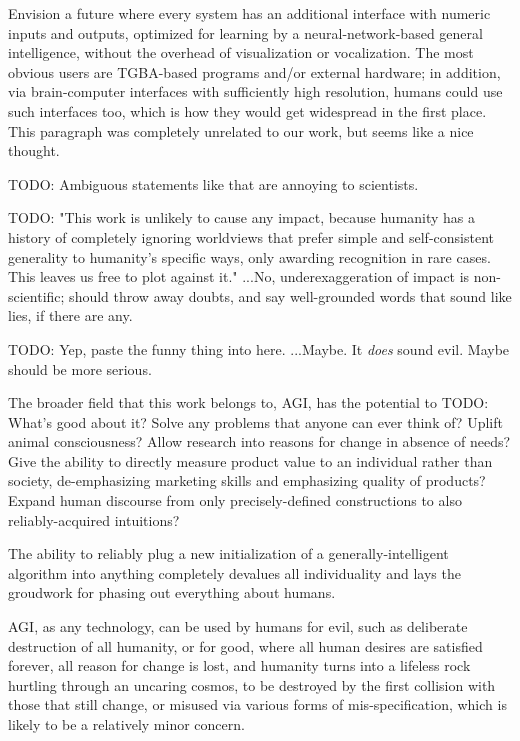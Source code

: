 \documentclass{article}
\begin{document}
Envision a future where every system has an additional interface with numeric inputs and outputs, optimized for learning by a neural-network-based general intelligence, without the overhead of visualization or vocalization. The most obvious users are TGBA-based programs and/or external hardware; in addition, via brain-computer interfaces with sufficiently high resolution, humans could use such interfaces too, which is how they would get widespread in the first place. This paragraph was completely unrelated to our work, but seems like a nice thought.

    TODO: Ambiguous statements like that are annoying to scientists.

    TODO: "This work is unlikely to cause any impact, because humanity has a history of completely ignoring worldviews that prefer simple and self-consistent generality to humanity's specific ways, only awarding recognition in rare cases. This leaves us free to plot against it." ...No, underexaggeration of impact is non-scientific; should throw away doubts, and say well-grounded words that sound like lies, if there are any.

    TODO: Yep, paste the funny thing into here. ...Maybe. It \textit{does} sound evil. Maybe should be more serious.

The broader field that this work belongs to, AGI, has the potential to TODO: What's good about it? Solve any problems that anyone can ever think of? Uplift animal consciousness? Allow research into reasons for change in absence of needs? Give the ability to directly measure product value to an individual rather than society, de-emphasizing marketing skills and emphasizing quality of products? Expand human discourse from only precisely-defined constructions to also reliably-acquired intuitions?

The ability to reliably plug a new initialization of a generally-intelligent algorithm into anything completely devalues all individuality and lays the groudwork for phasing out everything about humans.

AGI, as any technology, can be used by humans for evil, such as deliberate destruction of all humanity, or for good, where all human desires are satisfied forever, all reason for change is lost, and humanity turns into a lifeless rock hurtling through an uncaring cosmos, to be destroyed by the first collision with those that still change, or misused via various forms of mis-specification, which is likely to be a relatively minor concern.

\printbibliography
\end{document}
